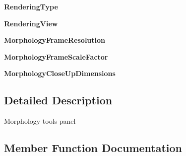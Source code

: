 \begin{DoxyCompactItemize}
\item 
{\bfseries Rendering\+Type}\hypertarget{classmeshy_1_1neuromorphovis_1_1interface_1_1ui_1_1morphology__panel_1_1MorphologyPanel_af7f5c9a9221e568b7c9bcad85102e1db}{}\label{classmeshy_1_1neuromorphovis_1_1interface_1_1ui_1_1morphology__panel_1_1MorphologyPanel_af7f5c9a9221e568b7c9bcad85102e1db}

\item 
{\bfseries Rendering\+View}\hypertarget{classmeshy_1_1neuromorphovis_1_1interface_1_1ui_1_1morphology__panel_1_1MorphologyPanel_abad62226f8901569e720e05872d7cab6}{}\label{classmeshy_1_1neuromorphovis_1_1interface_1_1ui_1_1morphology__panel_1_1MorphologyPanel_abad62226f8901569e720e05872d7cab6}

\item 
{\bfseries Morphology\+Frame\+Resolution}\hypertarget{classmeshy_1_1neuromorphovis_1_1interface_1_1ui_1_1morphology__panel_1_1MorphologyPanel_a830083676c40d9df1ca0a8c4687d9ff9}{}\label{classmeshy_1_1neuromorphovis_1_1interface_1_1ui_1_1morphology__panel_1_1MorphologyPanel_a830083676c40d9df1ca0a8c4687d9ff9}

\item 
{\bfseries Morphology\+Frame\+Scale\+Factor}\hypertarget{classmeshy_1_1neuromorphovis_1_1interface_1_1ui_1_1morphology__panel_1_1MorphologyPanel_ace29b4bd3a4755ae143a14b6b2ddd8db}{}\label{classmeshy_1_1neuromorphovis_1_1interface_1_1ui_1_1morphology__panel_1_1MorphologyPanel_ace29b4bd3a4755ae143a14b6b2ddd8db}

\item 
{\bfseries Morphology\+Close\+Up\+Dimensions}\hypertarget{classmeshy_1_1neuromorphovis_1_1interface_1_1ui_1_1morphology__panel_1_1MorphologyPanel_a77d8ba888b880584822fca6e1322ae77}{}\label{classmeshy_1_1neuromorphovis_1_1interface_1_1ui_1_1morphology__panel_1_1MorphologyPanel_a77d8ba888b880584822fca6e1322ae77}

\end{DoxyCompactItemize}


\subsection{Detailed Description}


\begin{DoxyVerb}Morphology tools panel\end{DoxyVerb}
 

\subsection{Member Function Documentation}
